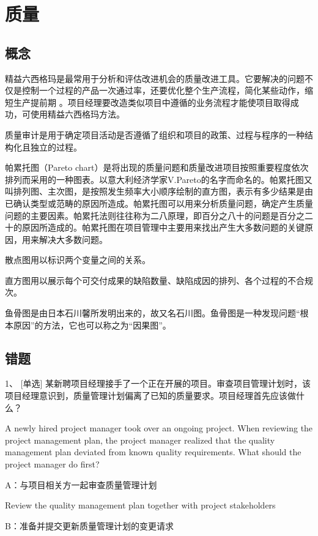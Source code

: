 
\chapter{质量}

\section{概念}

精益六西格玛是最常用于分析和评估改进机会的质量改进工具。它要解决的问题不仅是控制一个过程的产品一次通过率，还要优化整个生产流程，简化某些动作，缩短生产提前期 。项目经理要改造类似项目中遵循的业务流程才能使项目取得成功，可使用精益六西格玛方法。

质量审计是用于确定项目活动是否遵循了组织和项目的政策、过程与程序的一种结构化且独立的过程。

帕累托图（Pareto chart）是将出现的质量问题和质量改进项目按照重要程度依次排列而采用的一种图表。以意大利经济学家V.Pareto的名字而命名的。帕累托图又叫排列图、主次图，是按照发生频率大小顺序绘制的直方图，表示有多少结果是由已确认类型或范畴的原因所造成。帕累托图可以用来分析质量问题，确定产生质量问题的主要因素。帕累托法则往往称为二八原理，即百分之八十的问题是百分之二十的原因所造成的。帕累托图在项目管理中主要用来找出产生大多数问题的关键原因，用来解决大多数问题。


散点图用以标识两个变量之间的关系。


直方图用以展示每个可交付成果的缺陷数量、缺陷成因的排列、各个过程的不合规次。


鱼骨图是由日本石川馨所发明出来的，故又名石川图。鱼骨图是一种发现问题“根本原因”的方法，它也可以称之为“因果图”。

\section{错题}

1、 [单选] 某新聘项目经理接手了一个正在开展的项目。审查项目管理计划时，该项目经理意识到，质量管理计划偏离了已知的质量要求。项目经理首先应该做什么？

A newly hired project manager took over an ongoing project. When reviewing the project management plan, the project manager realized that the quality management plan deviated from known quality requirements. What should the project manager do first?

A：与项目相关方一起审查质量管理计划

Review the quality management plan together with project stakeholders

B：准备并提交更新质量管理计划的变更请求

